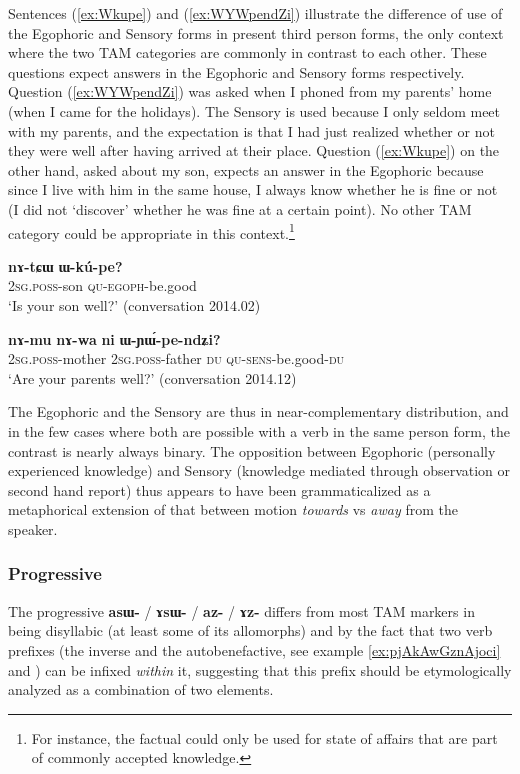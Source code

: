 \documentclass[oldfontcommands,oneside,a4paper,11pt]{article}
\newcommand{\ipa}[1]{\mbox{\phon\textbf{#1}}} %
\begin{document}
Sentences (\ref{ex:Wkupe}) and (\ref{ex:WYWpendZi}) illustrate the difference of use of the Egophoric and Sensory forms in present third person forms, the only context where the two TAM categories are commonly in contrast to each other. These questions expect answers in the Egophoric and Sensory forms respectively. Question (\ref{ex:WYWpendZi}) was asked when I phoned from my parents' home (when I came for the holidays). The Sensory is used because I only seldom meet with my parents, and the expectation is that I had just realized whether or not they were well after having arrived at their place. Question (\ref{ex:Wkupe}) on the other hand, asked about my son, expects an answer in the Egophoric because since I live with him in the same house, I always know whether he is fine or not (I did not `discover' whether he was fine at a certain point). No other TAM category could be appropriate in this context.\footnote{For instance, the factual could only be used for state of affairs that are part of commonly accepted knowledge.}
 
\begin{exe}
\ex \label{ex:Wkupe}
\gll \ipa{nɤ-tɕɯ} \ipa{ɯ-kú-pe?}\\
\textsc{2sg.poss}-son \textsc{qu-egoph}-be.good\\
\glt `Is your son well?' (conversation 2014.02)
\end{exe}

\begin{exe}
\ex \label{ex:WYWpendZi}
\gll 
\ipa{nɤ-mu}  	\ipa{nɤ-wa}  	\ipa{ni}  	\ipa{ɯ-ɲɯ́-pe-ndʑi?}  \\
\textsc{2sg.poss}-mother \textsc{2sg.poss}-father \textsc{du} \textsc{qu-sens}-be.good-\textsc{du} \\
\glt `Are your parents well?' (conversation 2014.12)
\end{exe}

The Egophoric and the Sensory are thus in near-complementary distribution, and in the few cases where both are possible with a verb in the same person form, the contrast is nearly always binary. The opposition between Egophoric (personally experienced knowledge) and  Sensory (knowledge mediated through observation or second hand report)  thus appears to have been grammaticalized as a metaphorical extension of that between motion \textit{towards} vs \textit{away} from the speaker.
 
\subsubsection{Progressive} \label{sec:prog}
The progressive \ipa{asɯ-} / \ipa{ɤsɯ-} / \ipa{az-} / \ipa{ɤz-} differs from most TAM markers in being disyllabic (at least some of its allomorphs) and by the fact that two verb prefixes (the inverse and the autobenefactive, see example \ref{ex:pjAkAwGznAjoci} and \citealt{jacques15spontaneous}) can be infixed \textit{within} it, suggesting that this prefix should be etymologically analyzed as a combination of two elements.
\end{document}
